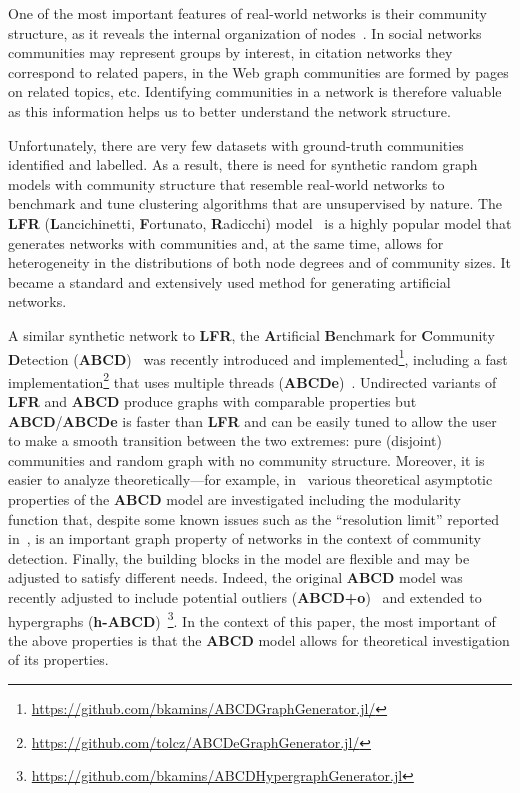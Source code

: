 \documentclass[12pt]{article}
\theoremstyle{definition}
\theoremstyle{remark}
\theoremstyle{remark}
\numberwithin{theorem}{section}
\begin{document}
One of the most important features of real-world networks is their community structure, as it reveals the internal organization of nodes~\cite{fortunato2010community}. In social networks communities may represent groups by interest, in citation networks they correspond to related papers, in the Web graph communities are formed by pages on related topics, etc. Identifying communities in a network is therefore valuable as this information helps us to better understand the network structure.

Unfortunately, there are very few datasets with ground-truth communities identified and labelled. As a result, there is need for synthetic random graph models with community structure that resemble real-world networks to benchmark and tune clustering algorithms that are unsupervised by nature. The \textbf{LFR} (\textbf{L}ancichinetti, \textbf{F}ortunato, \textbf{R}adicchi) model~\cite{lancichinetti2008benchmark,lancichinetti2009benchmarks} is a highly popular model that generates networks with communities and, at the same time, allows for heterogeneity in the distributions of both node degrees and of community sizes. It became a standard and extensively used method for generating artificial networks. 

A similar synthetic network to \textbf{LFR}, the \textbf{A}rtificial \textbf{B}enchmark for \textbf{C}ommunity \textbf{D}etection (\textbf{ABCD})~\cite{kaminski2021artificial} was recently introduced and implemented\footnote{\url{https://github.com/bkamins/ABCDGraphGenerator.jl/}}, including a fast implementation\footnote{\url{https://github.com/tolcz/ABCDeGraphGenerator.jl/}} that uses multiple threads (\textbf{ABCDe})~\cite{kaminski2022abcde}. Undirected variants of \textbf{LFR} and \textbf{ABCD} produce graphs with comparable properties but \textbf{ABCD}/\textbf{ABCDe} is faster than \textbf{LFR} and can be easily tuned to allow the user to make a smooth transition between the two extremes: pure (disjoint) communities and random graph with no community structure. Moreover, it is easier to analyze theoretically---for example, in~\cite{kaminski2022modularity} various theoretical asymptotic properties of the \textbf{ABCD} model are investigated including the modularity function that, despite some known issues such as the ``resolution limit'' reported in~\cite{fortunato2007resolution}, is an important graph property of networks in the context of community detection. Finally, the building blocks in the model are flexible and may be adjusted to satisfy different needs. Indeed, the original \textbf{ABCD} model was recently adjusted to include potential outliers (\textbf{ABCD+o})~\cite{kaminski2023artificial} and extended to hypergraphs (\textbf{h-ABCD})~\cite{kaminski2023hypergraph}\footnote{\url{https://github.com/bkamins/ABCDHypergraphGenerator.jl}}. In the context of this paper, the most important of the above properties is that the \textbf{ABCD} model allows for theoretical investigation of its properties.
\end{document}

